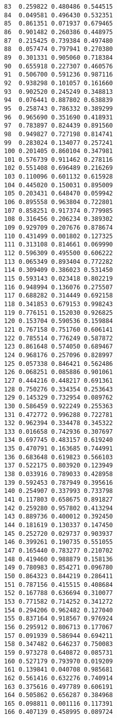 \documentclass[
  10pt,
  a4paper,oneside]{article}
\begin{document}
\begin{verbatim}
83  0.259822 0.480486 0.544515
84  0.049581 0.496430 0.532351
85  0.861351 0.071937 0.679465
86  0.901482 0.260386 0.448975
87  0.215425 0.739384 0.497480
88  0.057474 0.797941 0.270380
89  0.301331 0.905060 0.718384
90  0.655918 0.227307 0.460576
91  0.506700 0.591236 0.987116
92  0.938298 0.101057 0.161660
93  0.902520 0.245249 0.348813
94  0.076441 0.887802 0.638839
95  0.258743 0.786332 0.389299
96  0.965690 0.351690 0.418931
97  0.783897 0.824439 0.891560
98  0.949827 0.727198 0.814741
99  0.283024 0.134077 0.257241
100 0.201405 0.860104 0.347981
101 0.576739 0.911462 0.278116
102 0.551408 0.696489 0.216269
103 0.110096 0.601132 0.615928
104 0.445020 0.150031 0.895009
105 0.203431 0.648470 0.059942
106 0.895558 0.963804 0.722801
107 0.858251 0.917374 0.779985
108 0.316456 0.206234 0.389302
109 0.929709 0.207676 0.878674
110 0.431499 0.001802 0.127325
111 0.313108 0.814661 0.069990
112 0.596309 0.495500 0.606222
113 0.065349 0.893404 0.772282
114 0.309409 0.386023 0.531450
115 0.593143 0.023418 0.802219
116 0.948994 0.136076 0.275507
117 0.688282 0.314449 0.692158
118 0.341853 0.679153 0.998243
119 0.776151 0.152030 0.926825
120 0.153704 0.590536 0.159884
121 0.767158 0.751760 0.606141
122 0.785514 0.776249 0.587872
123 0.861648 0.574050 0.689467
124 0.968176 0.257096 0.828997
125 0.057338 0.846421 0.562486
126 0.068251 0.085886 0.901061
127 0.444216 0.448217 0.691361
128 0.750276 0.334354 0.253643
129 0.145329 0.732954 0.089762
130 0.586459 0.922249 0.255363
131 0.472772 0.996288 0.722781
132 0.962394 0.334478 0.345322
133 0.016658 0.742936 0.307697
134 0.697745 0.483157 0.619240
135 0.470791 0.163685 0.744991
136 0.683648 0.619823 0.566103
137 0.522175 0.803920 0.123949
138 0.033916 0.789033 0.428958
139 0.592453 0.787949 0.395616
140 0.254907 0.337993 0.733798
141 0.117803 0.658675 0.891827
142 0.259280 0.957802 0.413294
143 0.889736 0.400012 0.392450
144 0.181619 0.130337 0.147450
145 0.252720 0.029737 0.903937
146 0.399261 0.190735 0.551055
147 0.165440 0.783277 0.210702
148 0.419460 0.988879 0.158136
149 0.780983 0.854271 0.096780
150 0.864323 0.844219 0.286411
151 0.787156 0.415515 0.408684
152 0.167788 0.636694 0.310077
153 0.771582 0.714252 0.341272
154 0.294206 0.962482 0.127040
155 0.837164 0.918567 0.976924
156 0.295912 0.806713 0.177067
157 0.091939 0.586944 0.694211
158 0.347482 0.646237 0.750083
159 0.973278 0.640872 0.085731
160 0.527179 0.793970 0.019209
161 0.139841 0.040708 0.985681
162 0.561416 0.632276 0.740914
163 0.375616 0.497789 0.606191
164 0.505862 0.656287 0.384968
165 0.098811 0.001116 0.117391
166 0.407139 0.458995 0.089724

\end{verbatim}
\end{document}
